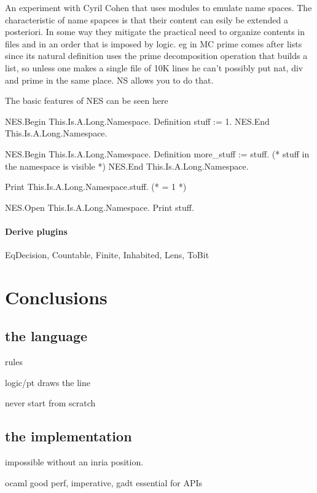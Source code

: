 \documentclass[a4paper, 11pt]{book}
\begin{document}
An experiment with Cyril Cohen that uses modules to emulate name spaces.
The characteristic of name spapces is that their content can esily be extended
a posteriori. In some way they mitigate the practical need to organize contents in
files and in an order that is imposed by logic.
eg in MC prime comes after lists since its natural definition uses the prime
decomposition operation that builds a list, so unless one makes a single file
of 10K lines he can't possibly put nat, div and prime in the same place.
NS allows you to do that.

The basic features of NES can be seen here

\begin{coqcode}
NES.Begin This.Is.A.Long.Namespace.
  Definition stuff := 1.
NES.End This.Is.A.Long.Namespace.

NES.Begin This.Is.A.Long.Namespace.
  Definition more_stuff := stuff. (* stuff in the namespace is visible *)
NES.End This.Is.A.Long.Namespace.

Print This.Is.A.Long.Namespace.stuff. (* = 1 *)

NES.Open This.Is.A.Long.Namespace.
Print stuff.
\end{coqcode}

\subsubsection{Derive plugins}

EqDecision, Countable, Finite, Inhabited, Lens, ToBit

\chapter{Conclusions}

\section{the language}

rules

logic/pt draws the line

never start from scratch

\section{the implementation}

impossible without an inria position.

ocaml good perf, imperative, gadt essential for APIs 
\end{document}
